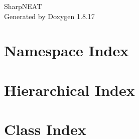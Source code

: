 \let\mypdfximage\pdfximage\def\pdfximage{\immediate\mypdfximage}\documentclass[twoside]{book}
\newcommand{\+}{\discretionary{\mbox{\scriptsize$\hookleftarrow$}}{}{}}
\newcommand{\clearemptydoublepage}{%
  \newpage{\pagestyle{empty}\cleardoublepage}%
}
\begin{document}
\hypersetup{pageanchor=false,
             bookmarksnumbered=true,
             pdfencoding=unicode
            }
\begin{titlepage}
\vspace*{7cm}
\begin{center}%
{\Large Sharp\+N\+E\+AT }\\
\vspace*{1cm}
{\large Generated by Doxygen 1.8.17}\\
\end{center}
\end{titlepage}
\clearemptydoublepage
{}
\tableofcontents
\clearemptydoublepage
{}
\hypersetup{pageanchor=true}

\chapter{Namespace Index}

\chapter{Hierarchical Index}

\chapter{Class Index}

\end{document}
